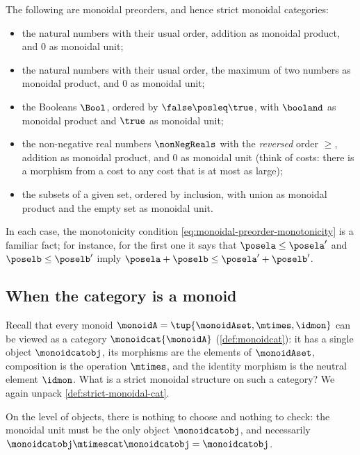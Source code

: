 \begin{example}
    \label{exa:monoidal-preorders}
    The following are monoidal preorders, and hence strict monoidal categories:
    \begin{itemize}
        \item the natural numbers with their usual order, addition as monoidal product, and $0$ as monoidal unit;
        \item the natural numbers with their usual order, the maximum of two numbers as monoidal product, and $0$ as monoidal unit;
        \item the Booleans $\Bool$, ordered by $\false \posleq \true$, with $\booland$ as monoidal product and $\true$ as monoidal unit;
        \item the non-negative real numbers $\nonNegReals$ with the \emph{reversed} order $\geq$, addition as monoidal product, and $0$ as monoidal unit (think of costs: there is a morphism from a cost to any cost that is at most as large);
        \item the subsets of a given set, ordered by inclusion, with union as monoidal product and the empty set as monoidal unit.
    \end{itemize}
    In each case, the monotonicity condition \cref{eq:monoidal-preorder-monotonicity} is a familiar fact; for instance, for the first one it says that $\posela \leq \posela'$ and $\poselb \leq \poselb'$ imply $\posela + \poselb \leq \posela' + \poselb'$.
\end{example}

\subsection{When the category is a monoid}
\label{sec:strict-monoidal-monoids}

Recall that every monoid $\monoidA = \tup{\monoidAset, \mtimes, \idmon}$ can be viewed as a category $\monoidcat{\monoidA}$ (\cref{def:monoidcat}): it has a single object $\monoidcatobj$, its morphisms are the elements of $\monoidAset$, composition is the operation $\mtimes$, and the identity morphism is the neutral element $\idmon$.
What is a strict monoidal structure on such a category?
We again unpack \cref{def:strict-monoidal-cat}.

On the level of objects, there is nothing to choose and nothing to check: the monoidal unit must be the only object $\monoidcatobj$, and necessarily $\monoidcatobj \mtimescat \monoidcatobj = \monoidcatobj$.

